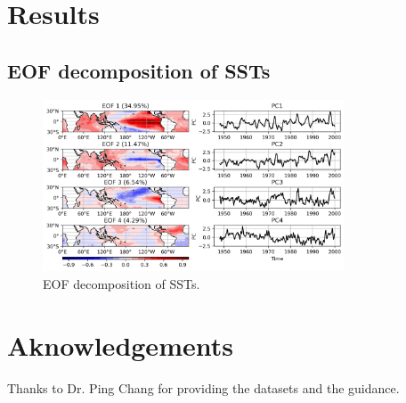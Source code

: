 \documentclass[12pt,a4paper]{article}
\begin{document}
\section{Results}\label{results}

\subsection{EOF decomposition of SSTs}\label{eof-decomposition}

\begin{figure}[htbp]
\centering
\includegraphics[width=0.8\textwidth]{figures/EOFs_PCs.png}
\caption{EOF decomposition of SSTs.}
\label{fig:EOFs_PCs}
\end{figure}

\section{Aknowledgements}\label{acknowledgements}

Thanks to Dr. Ping Chang for providing the datasets and the guidance.



\end{document}

